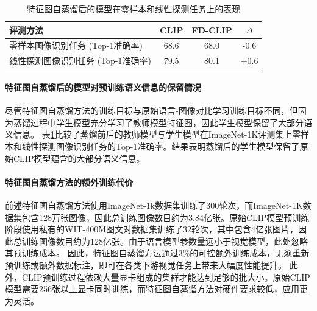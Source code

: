 
\begin{table}
\caption{特征图自蒸馏后的模型在零样本和线性探测任务上的表现
}
\centering
  \begin{tabular}{lccc}
\toprule
  评测方法 & CLIP & FD-CLIP & $\Delta$ \\
  \midrule
  零样本图像识别任务 (Top-1准确率) & 68.6 & 68.0 & -0.6 \\
  线性探测图像识别任务 (Top-1准确率) & 79.5 & 80.1 & +0.6 \\ 
\bottomrule
  \end{tabular}
\label{tab:fd-zero_shot}
\end{table}

\paragraph{特征图自蒸馏后的模型对预训练语义信息的保留情况} 
尽管特征图自蒸馏方法的训练目标与原始语言-图像对比学习训练目标不同，但因为蒸馏过程中学生模型充分学习了教师模型特征图，因此学生模型保留了大部分语义信息。
表\ref{tab:fd-zero_shot}比较了蒸馏前后的教师模型与学生模型在ImageNet-1K评测集上零样本和线性探测图像识别任务的Top-1准确率。结果表明蒸馏后的学生模型保留了原始CLIP模型蕴含的大部分语义信息。

\paragraph{特征图自蒸馏方法的额外训练代价} 前述特征图自蒸馏方法使用ImageNet-1k数据集训练了300轮次，而ImageNet-1K数据集包含128万张图像，因此总训练图像数目约为3.84亿张。原始CLIP模型预训练阶段使用私有的WIT-400M图文对数据集\cite{radford2021learning}训练了32轮次，其中包含4亿张图片，因此总训练图像数目约为128亿张。由于语言模型参数量远小于视觉模型，此处忽略其预训练成本。
因此，特征图自蒸馏方法通过3\%的可控额外训练成本，无须重新预训练或额外数据标注，即可在各类下游视觉任务上带来大幅度性能提升。
此外，CLIP预训练过程依赖大量显卡组成的集群才能达到足够的批大小。原始CLIP模型需要256张以上显卡同时训练，而特征图自蒸馏方法对硬件要求较低，应用更为灵活。%



